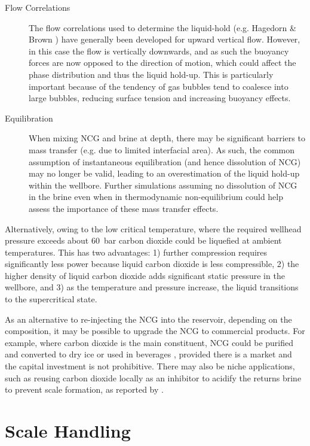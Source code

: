     \begin{description}
        \item[Flow Correlations] The flow correlations used to determine the liquid-hold (e.g. Hagedorn \& Brown \cite{Hagedorn1965}) have generally been developed for upward vertical flow. However, in this case the flow is vertically downwards, and as such the buoyancy forces are now opposed to the direction of motion, which could affect the phase distribution and thus the liquid hold-up. This is particularly important because of the tendency of gas bubbles tend to coalesce into large bubbles, reducing surface tension and increasing buoyancy effects.  
        \item[Equilibration] When mixing \ac{NCG} and brine at depth, there may be significant barriers to mass transfer (e.g. due to limited interfacial area). As such, the common assumption of instantaneous equilibration (and hence dissolution of \ac{NCG}) may no longer be valid, leading to an overestimation of the liquid hold-up within the wellbore. Further simulations assuming no dissolution of \ac{NCG} in the brine even when in thermodynamic non-equilibrium could help assess the importance of these mass transfer effects.
    \end{description}
    
    Alternatively, owing to the low critical temperature, where the required wellhead pressure exceeds about \qty{60}{\bar} carbon dioxide could be liquefied at ambient temperatures. This has two advantages: 1) further compression requires significantly less power because liquid carbon dioxide is less compressible, 2) the higher density of liquid carbon dioxide adds significant static pressure in the wellbore, and 3) as the temperature and pressure increase, the liquid transitions to the supercritical state.
        
    As an alternative to re-injecting the \ac{NCG} into the reservoir, depending on the composition, it may be possible to upgrade the \ac{NCG} to commercial products. For example, where carbon dioxide is the main constituent, \ac{NCG} could be purified and converted to dry ice or used in beverages \cite{Baba2022}, provided there is a market and the capital investment is not prohibitive. There may also be niche applications, such as reusing carbon dioxide locally as an inhibitor to acidify the returns brine to prevent scale formation, as reported by \citeauthor{Topcu2019} \cite{Topcu2019}.

\section{Scale Handling}
    \label{sec:litrev_scale_handling}

